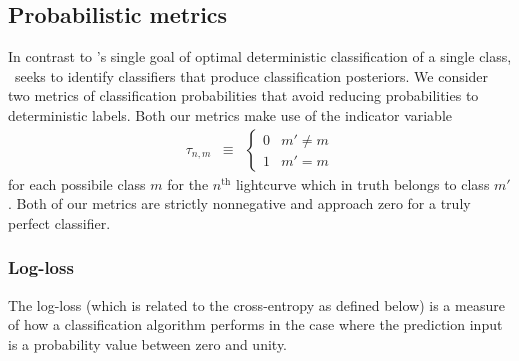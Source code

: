 

\subsection{Probabilistic metrics}
\label{sec:probabilistic}

In contrast to \snphotcc's single goal of optimal deterministic classification of a single class, \plasticc\ seeks to identify classifiers that produce classification posteriors.
We consider two metrics of classification probabilities that avoid reducing probabilities to deterministic labels.
Both our metrics make use of the indicator variable
\begin{eqnarray}
  \label{eq:indicator}
  \tau_{n, m} &\equiv& \begin{cases}
  0 & m' \neq m\\
  1 & m' = m
  \end{cases}
\end{eqnarray}
for each possibile class $m$ for the $n^{\mathrm{th}}$ lightcurve which in truth belongs to class $m'$.
Both of our metrics are strictly nonnegative and approach zero for a truly perfect classifier.

\subsubsection{Log-loss}
\label{sec:logloss}

The log-loss (which is related to the cross-entropy as defined below) is a measure of how a classification algorithm performs in the case where the prediction input is a probability value between zero and unity.

